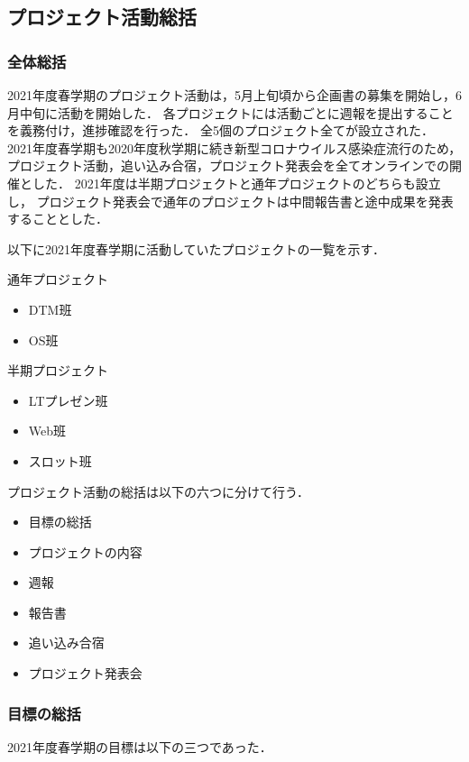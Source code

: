 \subsection*{プロジェクト活動総括}


\subsubsection*{全体総括}
2021年度春学期のプロジェクト活動は，5月上旬頃から企画書の募集を開始し，6月中旬に活動を開始した．
各プロジェクトには活動ごとに週報を提出することを義務付け，進捗確認を行った．
全5個のプロジェクト全てが設立された．
2021年度春学期も2020年度秋学期に続き新型コロナウイルス感染症流行のため，
プロジェクト活動，追い込み合宿，プロジェクト発表会を全てオンラインでの開催とした．
2021年度は半期プロジェクトと通年プロジェクトのどちらも設立し，
プロジェクト発表会で通年のプロジェクトは中間報告書と途中成果を発表することとした．

以下に2021年度春学期に活動していたプロジェクトの一覧を示す．

通年プロジェクト
\begin{itemize}
  \item DTM班
  \item OS班
\end{itemize}

半期プロジェクト
\begin{itemize}
  \item LTプレゼン班
  \item Web班
  \item スロット班
\end{itemize}

プロジェクト活動の総括は以下の六つに分けて行う．

\begin{itemize}
  \item 目標の総括
  \item プロジェクトの内容
  \item 週報
  \item 報告書
  \item 追い込み合宿
  \item プロジェクト発表会
\end{itemize}

\subsubsection*{目標の総括}
2021年度春学期の目標は以下の三つであった．

